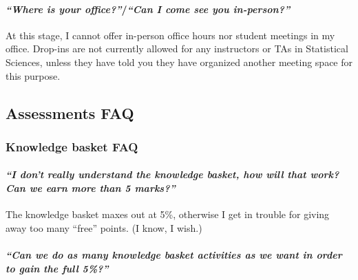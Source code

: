 \documentclass[
  openany]{book}
\begin{document}
\hypertarget{where-is-your-officecan-i-come-see-you-in-person}{%
\paragraph{\texorpdfstring{\emph{``Where is your \textbf{office}?''}/\emph{``Can I come see you in-person?''}}{``Where is your office?''/``Can I come see you in-person?''}}\label{where-is-your-officecan-i-come-see-you-in-person}}

At this stage, I cannot offer in-person office hours nor student meetings in my office. Drop-ins are not currently allowed for any instructors or TAs in Statistical Sciences, unless they have told you they have organized another meeting space for this purpose.

\hypertarget{assessments-faq}{%
\subsection{Assessments FAQ}\label{assessments-faq}}

\hypertarget{knowledge-basket-faq}{%
\subsubsection{Knowledge basket FAQ}\label{knowledge-basket-faq}}

\hypertarget{i-dont-really-understand-the-knowledge-basket-how-will-that-work-can-we-earn-more-than-5-marks}{%
\paragraph{\texorpdfstring{\emph{``I don't really understand the knowledge basket, how will that work? Can we earn more than 5 marks?''}}{``I don't really understand the knowledge basket, how will that work? Can we earn more than 5 marks?''}}\label{i-dont-really-understand-the-knowledge-basket-how-will-that-work-can-we-earn-more-than-5-marks}}

The knowledge basket maxes out at 5\%, otherwise I get in trouble for giving away too many ``free'' points. (I know, I wish.)

\hypertarget{can-we-do-as-many-knowledge-basket-activities-as-we-want-in-order-to-gain-the-full-5}{%
\paragraph{\texorpdfstring{\emph{``Can we do as many knowledge basket activities as we want in order to gain the full 5\%?''}}{``Can we do as many knowledge basket activities as we want in order to gain the full 5\%?''}}\label{can-we-do-as-many-knowledge-basket-activities-as-we-want-in-order-to-gain-the-full-5}}
\end{document}
